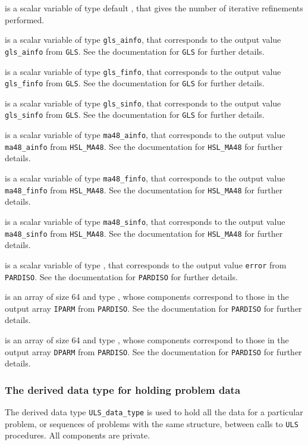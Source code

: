 \documentclass{galahad}
\newcommand{\packagename}{ULS}
\begin{document}
\begin{description}
 is a scalar variable of type default \integer,
that gives the number of iterative refinements performed.

 is a scalar variable of type {\tt gls\_ainfo},
that corresponds to the output value {\tt gls\_ainfo} 
from {\tt GLS}. See the documentation for {\tt GLS} for further
details.

 is a scalar variable of type {\tt gls\_finfo},
that corresponds to the output value {\tt gls\_finfo} 
from {\tt GLS}. See the documentation for {\tt GLS} for further
details.

 is a scalar variable of type {\tt gls\_sinfo},
that corresponds to the output value {\tt gls\_sinfo} 
from {\tt GLS}. See the documentation for {\tt GLS} for further
details.

 is a scalar variable of type {\tt ma48\_ainfo},
that corresponds to the output value {\tt ma48\_ainfo} 
from {\tt HSL\_MA48}. See the documentation for {\tt HSL\_MA48} for further
details.

 is a scalar variable of type {\tt ma48\_finfo},
that corresponds to the output value {\tt ma48\_finfo} 
from {\tt HSL\_MA48}. See the documentation for {\tt HSL\_MA48} for further
details.

 is a scalar variable of type {\tt ma48\_sinfo},
that corresponds to the output value {\tt ma48\_sinfo} 
from {\tt HSL\_MA48}. See the documentation for {\tt HSL\_MA48} for further
details.

 is a scalar variable of type \integer,
that corresponds to the output value {\tt error} 
from {\tt PARDISO}. See the documentation for {\tt PARDISO} for further
details.

 is an array of size 64 and type \integer,
whose components correspond to those in the output array {\tt IPARM} 
from {\tt PARDISO}. See the documentation for {\tt PARDISO} for further
details.

 is an array of size 64 and type \realdp,
whose components correspond to those in the output array {\tt DPARM} 
from {\tt PARDISO}. See the documentation for {\tt PARDISO} for further
details.

\end{description}


\subsubsection{The derived data type for holding problem data}\label{typedata}
The derived data type 
{\tt \packagename\_data\_type} 
is used to hold all the data for a particular problem,
or sequences of problems with the same structure, between calls to
{\tt \packagename} procedures. 
All components are private.
\end{document}
